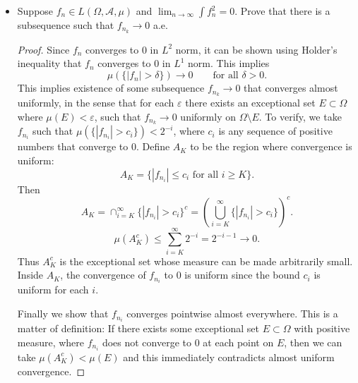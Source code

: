 \begin{itemize}
	\item Suppose $f_n \in L(\Omega, \mathcal{A}, \mu)$ and $\lim_{n \to \infty} \int f_n^2 = 0$. Prove that there is a subsequence such that $f_{n_k} \to  0$ a.e.
\begin{proof}
	Since $f_n$ converges to $0$ in $L^2$ norm, it can be shown using Holder's inequality that $f_n$ converges to $0$ in $L^1$ norm. This implies
	\[
		\mu\left( \{|f_n| > \delta\}  \right)  \to  0 \qquad \text{for all }\delta>0
	.\] 
	This implies existence of some subsequence $f_{n_k} \to 0$ that converges almost uniformly, in the sense that for each $\varepsilon$ there exists an exceptional set $E \subset \Omega$ where $\mu(E) < \varepsilon$, such that $f_{n_k} \to 0$ uniformly on $\Omega \setminus E$.
	To verify, we take $f_{n_i}$ such that $\mu\left( \{\left| f_{n_i} \right| > c_i\}  \right)  < 2^{-i}$, where $c_i$ is any sequence of positive numbers that converge to $0$. 
	Define $A_K$ to be the region where convergence is uniform:
	\[
		A_K = \{\left| f_{n_i} \right| \le c_i \text{ for all } i \ge  K\} 
	.\] 
	Then
	\[
		A_K = \cap_{i = K}^{\infty } \{|f_{n_i}| > c_i\} ^c = \left( \bigcup_{i = K} ^\infty \{|f_{n_i}| > c_i\} \right) ^c 
	.\] 
	\[
		\mu(A_K^c) \le \sum_{i=K}^{\infty} 2^{-i} = 2^{-i-1} \to 0
	.\] 
	Thus $A_K^c$ is the exceptional set whose measure can be made arbitrarily small. Inside $A_K$, the convergence of $f_{n_i}$ to $0$ is uniform since the bound  $c_i$ is uniform for each $i$.

	Finally we show that $f_{n_i}$ converges pointwise almost everywhere. This is a matter of definition: If there exists some exceptional set  $E \subset \Omega$ with positive measure, where $f_{n_i}$ does not converge to $0$ at each point on $E$, then we can take $\mu(A_K^c) < \mu(E)$ and this immediately contradicts almost uniform convergence.

	
	
\end{proof}


\end{itemize}
